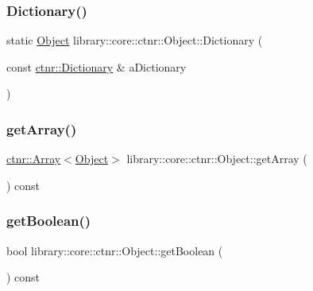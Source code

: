 \subsubsection{\texorpdfstring{Dictionary()}{Dictionary()}}
{\footnotesize\ttfamily static \hyperlink{classlibrary_1_1core_1_1ctnr_1_1Object}{Object} library\+::core\+::ctnr\+::\+Object\+::\+Dictionary (\begin{DoxyParamCaption}\item[{const \hyperlink{classlibrary_1_1core_1_1ctnr_1_1Dictionary}{ctnr\+::\+Dictionary} \&}]{a\+Dictionary }\end{DoxyParamCaption})\hspace{0.3cm}{\ttfamily [static]}}

\mbox{\label{classlibrary_1_1core_1_1ctnr_1_1Object_a37d488c95c8336b17400fd26874603b6}} 
\subsubsection{\texorpdfstring{get\+Array()}{getArray()}}
{\footnotesize\ttfamily \hyperlink{classlibrary_1_1core_1_1ctnr_1_1Array}{ctnr\+::\+Array}$<$\hyperlink{classlibrary_1_1core_1_1ctnr_1_1Object}{Object}$>$ library\+::core\+::ctnr\+::\+Object\+::get\+Array (\begin{DoxyParamCaption}{ }\end{DoxyParamCaption}) const}

\mbox{\label{classlibrary_1_1core_1_1ctnr_1_1Object_a57a984b26f914c33155c79f88e01b934}} 
\subsubsection{\texorpdfstring{get\+Boolean()}{getBoolean()}}
{\footnotesize\ttfamily bool library\+::core\+::ctnr\+::\+Object\+::get\+Boolean (\begin{DoxyParamCaption}{ }\end{DoxyParamCaption}) const}

